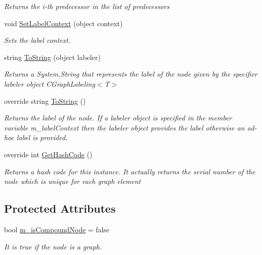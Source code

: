 \begin{DoxyCompactItemize}
\begin{DoxyCompactList}\small\item\em Returns the i-\/th predecessor in the list of predecessors \end{DoxyCompactList}\item 
void \hyperlink{class_graph_library_1_1_c_graph_node_ad2b029d744be615c8de5c8f396154de1}{Set\+Label\+Context} (object context)
\begin{DoxyCompactList}\small\item\em Sets the label context. \end{DoxyCompactList}\item 
string \hyperlink{class_graph_library_1_1_c_graph_node_af75b2590fa8bdce8c81c56f645f121a0}{To\+String} (object labeler)
\begin{DoxyCompactList}\small\item\em Returns a System.\+String that represents the label of the node given by the specifier labeler object C\+Graph\+Labeling$<$\+T$>$ \end{DoxyCompactList}\item 
override string \hyperlink{class_graph_library_1_1_c_graph_node_a3e26e00defb555fc26c9e9f7eaf003f5}{To\+String} ()
\begin{DoxyCompactList}\small\item\em Returns the label of the node. If a labeler object is specified in the member variable m\+\_\+label\+Context then the labeler object provides the label otherwise an ad-\/hoc label is provided. \end{DoxyCompactList}\item 
override int \hyperlink{class_graph_library_1_1_c_graph_node_a77205fe388f8b37cb45ceadefe40bcb0}{Get\+Hash\+Code} ()
\begin{DoxyCompactList}\small\item\em Returns a hash code for this instance. It actually returns the serial number of the node which is unique for each graph element \end{DoxyCompactList}\end{DoxyCompactItemize}
\subsection*{Protected Attributes}
\begin{DoxyCompactItemize}
\item 
bool \hyperlink{class_graph_library_1_1_c_graph_node_aec1f789c7ef7cf0e34d456eb3e7a9ccb}{m\+\_\+is\+Compound\+Node} = false
\begin{DoxyCompactList}\small\item\em It is true if the node is a graph. \end{DoxyCompactList}\end{DoxyCompactItemize}
